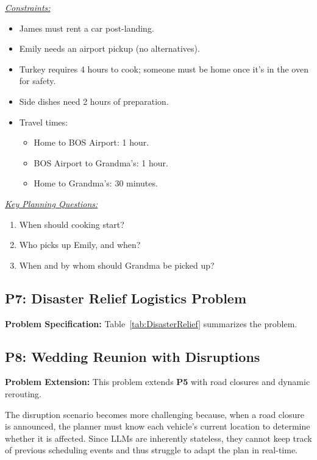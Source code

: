 \noindent \underline{\textit{Constraints:}}
\begin{itemize}[leftmargin=1.5em, topsep=-.0em, parsep=-.0em, label=*]
\item James must rent a car post-landing.
\item Emily needs an airport pickup (no alternatives).
\item Turkey requires 4 hours to cook; someone must be home once it's in the oven for safety.
\item Side dishes need 2 hours of preparation.
\item Travel times:
  \begin{itemize}[leftmargin=1em, topsep=-.0em, parsep=-.0em,]
  \item Home to BOS Airport: 1 hour.
  \item BOS Airport to Grandma’s: 1 hour.
  \item Home to Grandma’s: 30 minutes.
  \end{itemize}
\end{itemize}

\noindent \underline{\textit{Key Planning Questions:}}
\begin{enumerate}[leftmargin=1.5em, topsep=-.0em, parsep=-.0em, label=\arabic*.]
\item When should cooking start?
\item Who picks up Emily, and when?
\item When and by whom should Grandma be picked up?
\end{enumerate}




\subsection*{P7: Disaster Relief Logistics Problem}

\noindent \textbf{Problem Specification:} Table~\ref{tab:DisasterRelief} summarizes the problem.



\subsection*{P8: Wedding Reunion with Disruptions}

\noindent \textbf{Problem Extension:}
This problem extends \textbf{P5} with road closures and dynamic rerouting.

The disruption scenario becomes more challenging because, when a road closure is announced, the planner must know each vehicle's current location to determine whether it is affected. Since LLMs are inherently stateless, they cannot keep track of previous scheduling events and thus struggle to adapt the plan in real-time. 

